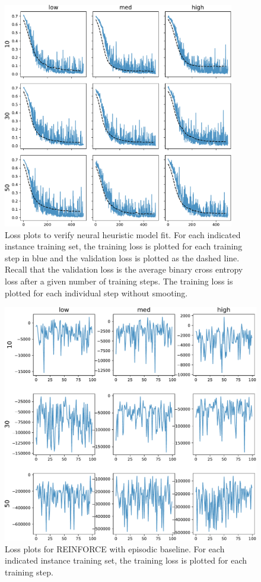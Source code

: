 \documentclass[a4paper]{article}
\theoremstyle{definition}
\theoremstyle{plain}
\begin{document}
\begin{figure}
  \centering
  \includegraphics[width=0.9\textwidth]{figures/single/neural_fit.pdf}
  \caption{Loss plots to verify neural heuristic model fit. For each indicated
    instance training set, the training loss is plotted for each training step
    in blue and the validation loss is plotted as the dashed line. Recall that
    the validation loss is the average binary cross entropy loss after a given
    number of training steps. The training loss is plotted for each individual
    step without smooting.}
  \label{fig:neural_fit}
\end{figure}

\begin{figure}
  \centering
  \includegraphics[width=1.0\textwidth]{figures/single/rl_neural_episodic_fit.pdf}
  \caption{Loss plots for REINFORCE with episodic baseline. For each indicated
    instance training set, the training loss is plotted for each training step.}
  \label{fig:rl_neural_episodic_fit}
\end{figure}
\end{document}
